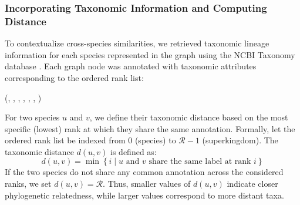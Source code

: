 \documentclass[11pt]{article}
\begin{document}
	\subsubsection[step 3]{Incorporating Taxonomic Information and Computing Distance}
	\label{subsubsec:step3}
	To contextualize cross-species similarities, we retrieved taxonomic lineage information for each species represented in the graph using the NCBI Taxonomy database \cite{NCBITaxonomy}.
	Each graph node was annotated with taxonomic attributes corresponding to the ordered rank list:
	\begin{center}
		(, , , , , , )
	\end{center}
	For two species $u$ and $v$, we define their taxonomic distance based on the most specific (lowest) rank at which they share the same annotation.  
	Formally, let the ordered rank list be indexed from $0$ (species) to $\mathcal{R}-1$ (superkingdom).  
	The taxonomic distance $d(u,v)$ is defined as:
	{\setlength{\abovedisplayskip}{4pt}
		\setlength{\belowdisplayskip}{4pt}
		\begin{equation*}
			d(u,v) = \min\left\{ i \mid \text{$u$ and $v$ share the same label at rank } i \right\}
		\end{equation*}
	}
	\noindent
	If the two species do not share any common annotation across the considered ranks, we set $d(u,v) = \mathcal{R}$. Thus, smaller values of $d(u,v)$ indicate closer phylogenetic relatedness, while larger values correspond to more distant taxa.
	
\end{document}
